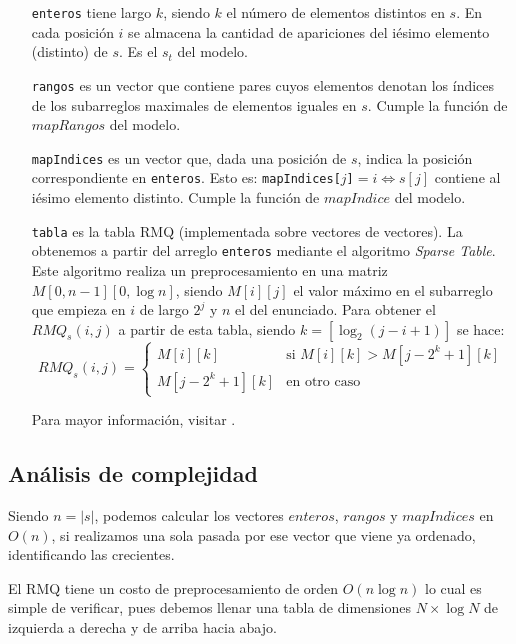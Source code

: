 \begin{itemize}
  \item[\tt enteros] tiene largo $k$, siendo $k$ el número de elementos
  distintos en $s$. En cada posición $i$ se almacena la cantidad de apariciones
  del iésimo elemento (distinto) de $s$. Es el $s_t$ del modelo.

  \item[\tt rangos] es un vector que contiene pares cuyos elementos denotan
  los índices de los subarreglos maximales de elementos iguales en $s$. Cumple
  la función de $mapRangos$ del modelo.

  \item[\tt mapIndices] es un vector que, dada una posición de $s$, indica la posición
  correspondiente en {\tt enteros}. Esto es: {\tt mapIndices[$j$]}$=i \Leftrightarrow s[j]$
  contiene al iésimo elemento distinto. Cumple la función de $mapIndice$ del modelo.

  \item[\tt tabla] es la tabla RMQ (implementada sobre vectores de vectores).
  La obtenemos a partir del arreglo {\tt enteros} mediante el algoritmo {\sl
  Sparse Table}. Este algoritmo realiza un preprocesamiento en una matriz
  $M[0,n-1][0,\log n]$, siendo $M[i][j]$ el valor máximo en el subarreglo
  que empieza en $i$ de largo $2^j$ y $n$ el del enunciado. Para obtener el $RMQ_s(i, j)$ a partir
  de esta tabla, siendo $k = [\log_2(j - i + 1)]$ se hace:
  \[ RMQ_s(i, j) = \left\{ \begin{array}{ll}
                 M[i][k] & \mbox{si $M[i][k] > M[j-2^k+1][k]$}\\
                 M[j-2^k+1][k] & \mbox{en otro caso}\end{array} \right. \]

  Para mayor información, visitar \cite{topcoder}.
\end{itemize}

\subsection*{Análisis de complejidad}

Siendo $n=|s|$, podemos calcular los vectores $enteros$, $rangos$ y
$mapIndices$ en $O(n)$, si realizamos una sola pasada por ese vector que
viene ya ordenado, identificando las crecientes.

El RMQ tiene un costo de preprocesamiento de orden $O(n\log n)$ lo cual es
simple de verificar, pues debemos llenar una tabla de dimensiones $N \times
\log N$ de izquierda a derecha y de arriba hacia abajo.

